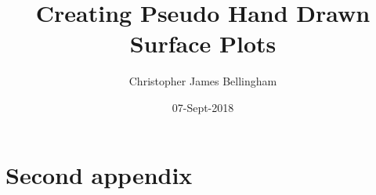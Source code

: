 \documentclass{mproj}
\begin{document}
\title{Creating Pseudo Hand Drawn Surface Plots}
\author{Christopher James Bellingham}
\date{07-Sept-2018}
\maketitle



\educationalconsent

\newpage


\tableofcontents







\appendix

\chapter{Second appendix}



\end{document}
